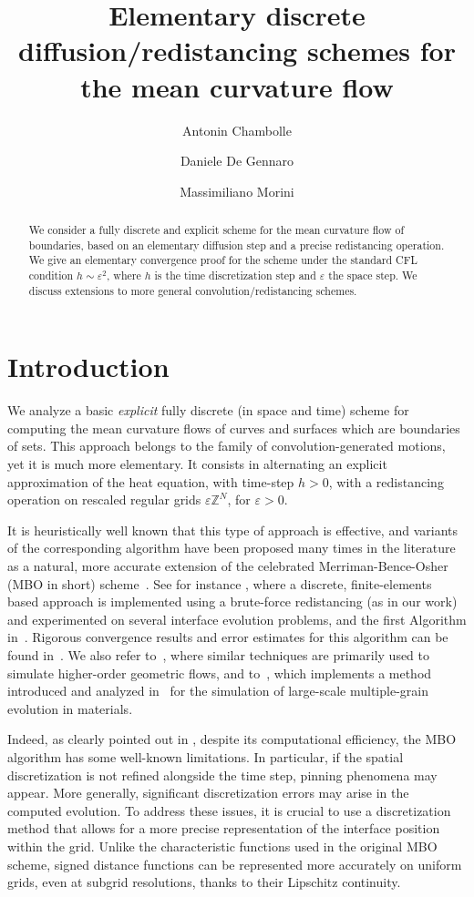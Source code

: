 \documentclass[10pt]{amsart}
\title[Discrete diffusion/redistancing  for the mean curvature flow]{Elementary discrete diffusion/redistancing schemes for the mean curvature flow}
\author[A. Chambolle]{Antonin Chambolle}
\author[D. De Gennaro]{Daniele De Gennaro}
\author[M. Morini]{Massimiliano Morini}
\date{}
\theoremstyle{plain}
\theoremstyle{definition}
\newcommand{\Z}{\mathbb{Z}}
\newcommand{\e}{\varepsilon}
\newcommand{\ez}{\e\Z^N}
\numberwithin{equation}{section}
\begin{document}
 
\begin{abstract}
   We consider a fully discrete and explicit scheme for the mean curvature
    flow of boundaries, based on an elementary diffusion step and a precise redistancing operation. We give an elementary convergence proof for
    the scheme under the standard CFL condition $h\sim\e^2$, where $h$ is the
    time discretization step and $\e$ the space step. We discuss extensions
    to more general convolution/redistancing schemes.
\end{abstract}
\maketitle
\section{Introduction}
We analyze a basic \textit{explicit} fully discrete (in space and time) scheme for computing the mean curvature
flows of curves and surfaces which are boundaries of sets. This approach belongs to
the family of convolution-generated motions, yet it is much more elementary. It
consists in alternating an explicit approximation of the heat equation, with time-step $h>0$, with a redistancing
operation on rescaled regular grids $\ez$, for $\e>0$.  

It is heuristically well known  that this type of approach is effective, and variants of the corresponding algorithm have been proposed many times in the literature as a natural, more accurate extension of the celebrated Merriman-Bence-Osher (MBO in short) scheme~\cite{BMO92}. See for instance \cite{KimNot}, where a discrete, finite-elements based approach is implemented using  a brute-force redistancing (as in our work) and  experimented on several interface evolution problems, and the first Algorithm in~\cite{EsedogluRuuthTsai10}. Rigorous convergence results and error estimates for this algorithm can be found in~\cite{IshKim16,IshIzu18}. We also refer to~\cite{EsedogluRuuthTsai08,Metivetetal2021}, where similar techniques are primarily used to simulate higher-order geometric flows, and to~\cite{ElseyEsedogluSmereka11}, which implements a method introduced and analyzed in~\cite[Sec.~5.3]{EsedogluRuuthTsai10} for the simulation of large-scale multiple-grain evolution in materials.

Indeed, as clearly pointed out in \cite{EsedogluRuuthTsai10}, despite its computational efficiency, the MBO algorithm has some well-known limitations. In particular, if the spatial discretization is not refined alongside the time step, pinning phenomena may appear. More generally,  significant discretization errors may arise in the computed evolution. To address these issues, it is crucial to use a discretization method that allows for a more precise representation of the interface position within the grid. 
Unlike the characteristic functions used in the original MBO scheme, signed distance functions can be represented more accurately on uniform grids, even at subgrid resolutions, thanks to their Lipschitz continuity.
\end{document}
